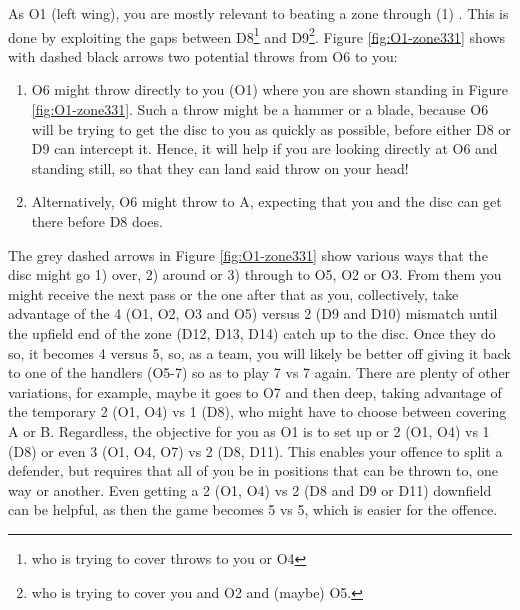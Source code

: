 \documentclass{tufte-handout}
\begin{document}
As O1 
(left wing), 
you are mostly relevant to 
beating a zone through
(1)
.  
This is done by exploiting the gaps between 
D8\footnote{
who is trying to cover throws 
to you or O4} 
and D9\footnote{ 
who is trying to cover you 
and O2 and 
(maybe) O5.}.
Figure \ref{fig:O1-zone331} shows 
with dashed black arrows
two potential throws from O6 to you:
\begin{enumerate}
\item O6 might throw directly to you 
(O1) where you are shown 
standing in Figure \ref{fig:O1-zone331}. 
Such a throw might be a hammer
or a blade,
because O6 will be trying to get the disc to you 
as quickly as possible, 
before either D8 or D9 can intercept it. 
Hence, it will help if you are looking directly at O6 
and standing still, 
so that they can land said throw on your head!
\item Alternatively, O6 might throw to A, 
expecting that you and the disc can get there 
before D8 does.
\end{enumerate}

The grey dashed arrows in Figure \ref{fig:O1-zone331} 
show various ways that the disc might 
go 
1) over,
2) around or
3) through 
to O5, O2 or O3. 
From them you
might receive the next pass
or the one after that
as you, collectively, 
take advantage of the 
4 (O1, O2, O3 and O5) 
versus 2 (D9 and D10)
mismatch until the 
upfield end of the zone 
(D12, D13, D14) 
catch up to the disc. 
Once they do so, 
it becomes 4 versus 5, 
so, 
as a team,
 you will likely be 
better off giving it back to 
one of the handlers 
(O5-7) 
so as to play 
7 vs 7 again. 
There are plenty of other variations,
for example, maybe it 
goes 
to O7 and then deep,
taking advantage 
of the temporary 
2 (O1, O4) vs 1 (D8), 
who might have to choose 
between covering A
or B.  Regardless, 
the objective for you
as O1
is to set up 
or 2 (O1, O4) 
vs 1 (D8) 
or even 3 (O1, O4, O7) 
vs 2 (D8, D11). 
This enables your offence 
to split a defender, 
but requires that all of you
be in positions 
that can be thrown to, 
one way or another. 
Even getting a 
2 (O1, O4) 
vs 2 (D8 and D9 or D11)
downfield can be helpful, 
as then the game 
becomes 5 vs 5, 
which is easier for the offence. 
\end{document}
